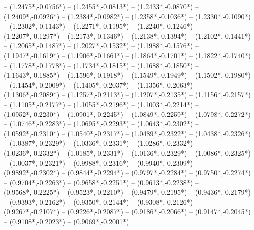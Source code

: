 {	-- ({1.2475*\dx},{-0.0756*\dy})
	-- ({1.2455*\dx},{-0.0813*\dy})
	-- ({1.2433*\dx},{-0.0870*\dy})
	-- ({1.2409*\dx},{-0.0926*\dy})
	-- ({1.2384*\dx},{-0.0982*\dy})
	-- ({1.2358*\dx},{-0.1036*\dy})
	-- ({1.2330*\dx},{-0.1090*\dy})
	-- ({1.2302*\dx},{-0.1143*\dy})
	-- ({1.2271*\dx},{-0.1195*\dy})
	-- ({1.2240*\dx},{-0.1246*\dy})
	-- ({1.2207*\dx},{-0.1297*\dy})
	-- ({1.2173*\dx},{-0.1346*\dy})
	-- ({1.2138*\dx},{-0.1394*\dy})
	-- ({1.2102*\dx},{-0.1441*\dy})
	-- ({1.2065*\dx},{-0.1487*\dy})
	-- ({1.2027*\dx},{-0.1532*\dy})
	-- ({1.1988*\dx},{-0.1576*\dy})
	-- ({1.1947*\dx},{-0.1619*\dy})
	-- ({1.1906*\dx},{-0.1661*\dy})
	-- ({1.1864*\dx},{-0.1701*\dy})
	-- ({1.1822*\dx},{-0.1740*\dy})
	-- ({1.1778*\dx},{-0.1778*\dy})
	-- ({1.1734*\dx},{-0.1815*\dy})
	-- ({1.1688*\dx},{-0.1850*\dy})
	-- ({1.1643*\dx},{-0.1885*\dy})
	-- ({1.1596*\dx},{-0.1918*\dy})
	-- ({1.1549*\dx},{-0.1949*\dy})
	-- ({1.1502*\dx},{-0.1980*\dy})
	-- ({1.1454*\dx},{-0.2009*\dy})
	-- ({1.1405*\dx},{-0.2037*\dy})
	-- ({1.1356*\dx},{-0.2063*\dy})
	-- ({1.1306*\dx},{-0.2089*\dy})
	-- ({1.1257*\dx},{-0.2113*\dy})
	-- ({1.1207*\dx},{-0.2135*\dy})
	-- ({1.1156*\dx},{-0.2157*\dy})
	-- ({1.1105*\dx},{-0.2177*\dy})
	-- ({1.1055*\dx},{-0.2196*\dy})
	-- ({1.1003*\dx},{-0.2214*\dy})
	-- ({1.0952*\dx},{-0.2230*\dy})
	-- ({1.0901*\dx},{-0.2245*\dy})
	-- ({1.0849*\dx},{-0.2259*\dy})
	-- ({1.0798*\dx},{-0.2272*\dy})
	-- ({1.0746*\dx},{-0.2283*\dy})
	-- ({1.0695*\dx},{-0.2293*\dy})
	-- ({1.0643*\dx},{-0.2302*\dy})
	-- ({1.0592*\dx},{-0.2310*\dy})
	-- ({1.0540*\dx},{-0.2317*\dy})
	-- ({1.0489*\dx},{-0.2322*\dy})
	-- ({1.0438*\dx},{-0.2326*\dy})
	-- ({1.0387*\dx},{-0.2329*\dy})
	-- ({1.0336*\dx},{-0.2331*\dy})
	-- ({1.0286*\dx},{-0.2332*\dy})
	-- ({1.0236*\dx},{-0.2332*\dy})
	-- ({1.0185*\dx},{-0.2331*\dy})
	-- ({1.0136*\dx},{-0.2329*\dy})
	-- ({1.0086*\dx},{-0.2325*\dy})
	-- ({1.0037*\dx},{-0.2321*\dy})
	-- ({0.9988*\dx},{-0.2316*\dy})
	-- ({0.9940*\dx},{-0.2309*\dy})
	-- ({0.9892*\dx},{-0.2302*\dy})
	-- ({0.9844*\dx},{-0.2294*\dy})
	-- ({0.9797*\dx},{-0.2284*\dy})
	-- ({0.9750*\dx},{-0.2274*\dy})
	-- ({0.9704*\dx},{-0.2263*\dy})
	-- ({0.9658*\dx},{-0.2251*\dy})
	-- ({0.9613*\dx},{-0.2238*\dy})
	-- ({0.9568*\dx},{-0.2225*\dy})
	-- ({0.9523*\dx},{-0.2210*\dy})
	-- ({0.9479*\dx},{-0.2195*\dy})
	-- ({0.9436*\dx},{-0.2179*\dy})
	-- ({0.9393*\dx},{-0.2162*\dy})
	-- ({0.9350*\dx},{-0.2144*\dy})
	-- ({0.9308*\dx},{-0.2126*\dy})
	-- ({0.9267*\dx},{-0.2107*\dy})
	-- ({0.9226*\dx},{-0.2087*\dy})
	-- ({0.9186*\dx},{-0.2066*\dy})
	-- ({0.9147*\dx},{-0.2045*\dy})
	-- ({0.9108*\dx},{-0.2023*\dy})
	-- ({0.9069*\dx},{-0.2001*\dy})
}

